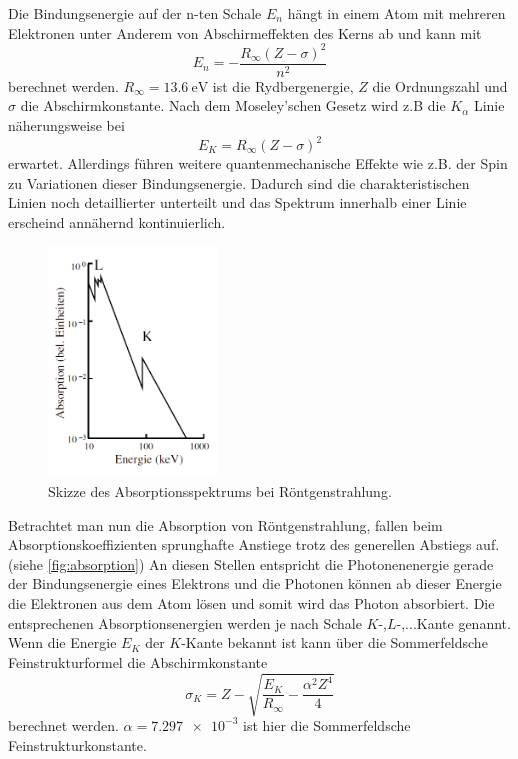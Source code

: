 Die Bindungsenergie auf der n-ten Schale $E_n$ hängt in einem Atom mit mehreren Elektronen unter Anderem von Abschirmeffekten des Kerns ab und kann mit
\begin{equation}
    E_n = -\frac{R_\infty(Z-\sigma)^2}{n^2}
\end{equation}
berechnet werden. 
$R_\infty=\SI{13.6}{\electronvolt}$ ist die Rydbergenergie, $Z$ die Ordnungszahl und $\sigma$ die Abschirmkonstante.\cite{V602}
Nach dem Moseley'schen Gesetz wird z.B die $K_\alpha$ Linie näherungsweise bei
\begin{equation}
    E_K = R_\infty(Z-\sigma)^2
    \label{eq:moseley}
\end{equation}
erwartet.
Allerdings führen weitere quantenmechanische Effekte wie z.B. der Spin zu Variationen dieser Bindungsenergie.
Dadurch sind die charakteristischen Linien noch detaillierter unterteilt und das Spektrum innerhalb einer Linie erscheind annähernd kontinuierlich.

\begin{figure}
    \centering
    \includegraphics[width=0.4\textwidth]{images/absorption.png}
    \caption{Skizze des Absorptionsspektrums bei Röntgenstrahlung.\cite{V602}}
    \label{fig:absorption}
\end{figure}

Betrachtet man nun die Absorption von Röntgenstrahlung, fallen beim Absorptionskoeffizienten sprunghafte Anstiege trotz des generellen Abstiegs auf.(siehe \autoref{fig:absorption})
An diesen Stellen entspricht die Photonenenergie gerade der Bindungsenergie eines Elektrons und die Photonen können ab dieser Energie die Elektronen aus dem Atom lösen und somit wird das Photon absorbiert.
Die entsprechenen Absorptionsenergien werden je nach Schale $K$-,$L$-,...Kante genannt.
Wenn die Energie $E_K$ der $K$-Kante bekannt ist kann über die Sommerfeldsche Feinstrukturformel die Abschirmkonstante 
\begin{equation}
    \sigma_K = Z - \sqrt{\frac{E_K}{R_\infty}-\frac{\alpha^2Z^4}{4}}
    \label{eq:abschirm}
\end{equation}
berechnet werden. $\alpha=\num{7.297e-3}$ ist hier die Sommerfeldsche Feinstrukturkonstante.\cite{physics_constants}

